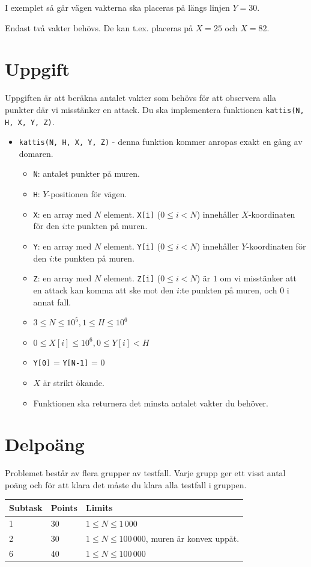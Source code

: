 I exemplet så går vägen vakterna ska placeras på längs linjen $Y = 30$.

Endast två vakter behövs. De kan t.ex. placeras på $X = 25$ och $X = 82$.

\section*{Uppgift}
Uppgiften är att beräkna antalet vakter som behövs för att observera alla punkter där vi misstänker en attack. Du ska implementera funktionen
\texttt{kattis(N, H, X, Y, Z)}.

\begin{itemize}
  \item \texttt{kattis(N, H, X, Y, Z)} - denna funktion kommer anropas exakt en gång av domaren.
  \begin{itemize}
    \item \texttt{N}: antalet punkter på muren.
    \item \texttt{H}: $Y$-positionen för vägen.
    \item \texttt{X}: en array med $N$ element. \texttt{X[i]} ($0 \le i < N$) innehåller $X$-koordinaten för den $i$:te punkten på muren.
    \item \texttt{Y}: en array med $N$ element. \texttt{Y[i]} ($0 \le i < N$) innehåller $Y$-koordinaten för den $i$:te punkten på muren.
    \item \texttt{Z}: en array med $N$ element. \texttt{Z[i]} ($0 \le i < N$) är $1$ om vi misstänker att en attack kan komma att ske mot den $i$:te punkten på muren, och 0 i annat fall.
    \item $3 \le N \le 10^5, 1 \le H \le 10^6$
    \item $0 \le X[i] \le 10^6, 0 \le Y[i] < H$
    \item \texttt{Y[0]} = \texttt{Y[N-1]} = 0
    \item $X$ är strikt ökande.
    \item Funktionen ska returnera det minsta antalet vakter du behöver.
  \end{itemize}
\end{itemize}

\section*{Delpoäng}
Problemet består av flera grupper av testfall. Varje grupp ger ett visst antal poäng och för att klara det måste du klara alla testfall i gruppen.

\begin{tabular}{|l|l|l|}
  \hline
  \textbf{Subtask} & \textbf{Points} & \textbf{Limits} \\ \hline
  1 & 30 & $1 \le N \le 1\,000$ \\ \hline
  2 & 30 & $1 \le N \le 100\,000$, muren är konvex uppåt. \\ \hline
  6 & 40 & $1 \le N \le 100\,000$ \\ \hline
\end{tabular}

